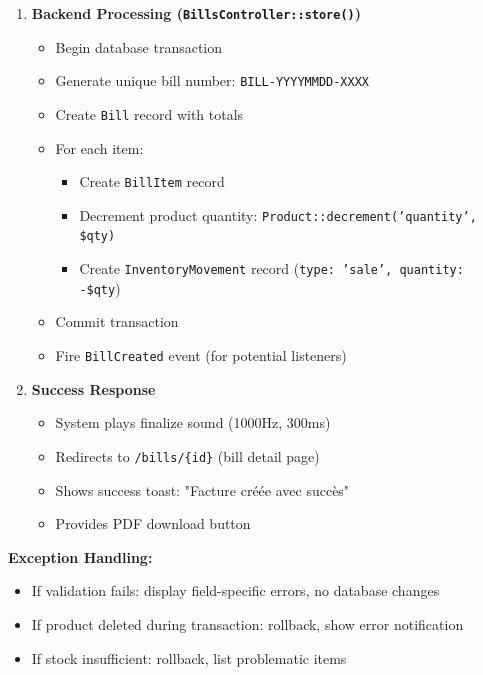\begin{enumerate}[resume,leftmargin=*]
    \item \textbf{Backend Processing (\texttt{BillsController::store()})}
    \begin{itemize}
        \item Begin database transaction
        \item Generate unique bill number: \texttt{BILL-YYYYMMDD-XXXX}
        \item Create \texttt{Bill} record with totals
        \item For each item:
        \begin{itemize}
            \item Create \texttt{BillItem} record
            \item Decrement product quantity: \texttt{Product::decrement('quantity', \$qty)}
            \item Create \texttt{InventoryMovement} record (\texttt{type: 'sale', quantity: -\$qty})
        \end{itemize}
        \item Commit transaction
        \item Fire \texttt{BillCreated} event (for potential listeners)
    \end{itemize}
    
    \item \textbf{Success Response}
    \begin{itemize}
        \item System plays finalize sound (1000Hz, 300ms)
        \item Redirects to \texttt{/bills/\{id\}} (bill detail page)
        \item Shows success toast: "Facture créée avec succès"
        \item Provides PDF download button
    \end{itemize}
\end{enumerate}

\textbf{Exception Handling:}
\begin{itemize}
    \item If validation fails: display field-specific errors, no database changes
    \item If product deleted during transaction: rollback, show error notification
    \item If stock insufficient: rollback, list problematic items
\end{itemize}

